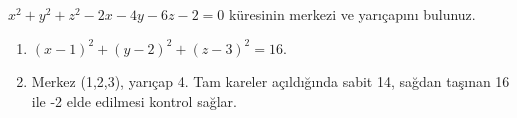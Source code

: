 \begin{tcolorbox}[title={Örnek 2.15 | Defterdeki ikinci küre},colframe=accent]\(x^2+y^2+z^2-2x-4y-6z-2=0\) küresinin merkezi ve yarıçapını bulunuz.
\par{}\end{tcolorbox}
\begin{tcolorbox}[title={Adım adım çözüm},colback=green!3!white,colframe=green]\begin{enumerate}
\item \((x-1)^2+(y-2)^2+(z-3)^2=16\).
\item Merkez (1,2,3), yarıçap 4. Tam kareler açıldığında sabit 14, sağdan taşınan 16 ile -2 elde edilmesi kontrol sağlar.
\end{enumerate}\end{tcolorbox}

